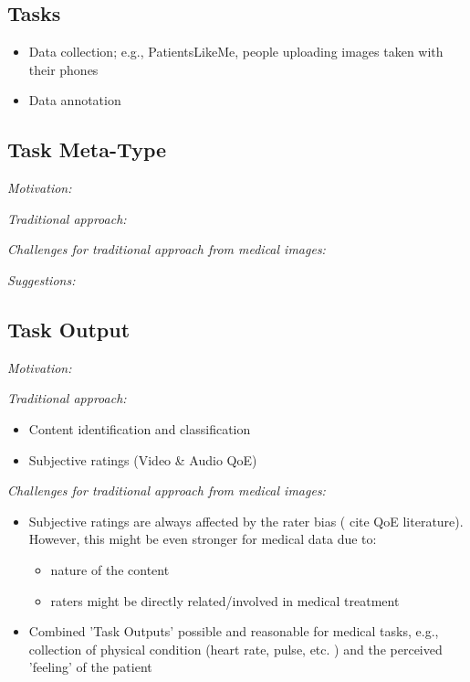 \documentclass[10pt,twocolumn,letterpaper]{article}
\begin{document}
% 
% 
\subsection{Tasks}
\begin{itemize}
    \item Data collection; e.g., PatientsLikeMe, people uploading images taken with their phones
    \item Data annotation
\end{itemize}

\subsection{Task Meta-Type}
\emph{Motivation:} 

\emph{Traditional approach:}

\emph{Challenges for traditional approach from medical images:}

\emph{Suggestions:}

\subsection{Task Output}
\emph{Motivation:} 

\emph{Traditional approach:}
\begin{itemize}
    \item Content identification and classification
    \item Subjective ratings (Video \& Audio QoE)
\end{itemize}

\emph{Challenges for traditional approach from medical images:}
\begin{itemize}
    \item Subjective ratings are always affected by the rater bias ( cite QoE literature). However, this might be even stronger for medical data due to: 
        \begin{itemize}
            \item nature of the content
            \item raters might be directly related/involved in medical treatment
        \end{itemize}
    \item Combined 'Task Outputs' possible and reasonable for medical tasks, e.g., collection of physical condition (heart rate, pulse, etc. ) and the perceived 'feeling' of the patient
\end{itemize}
\end{document}
